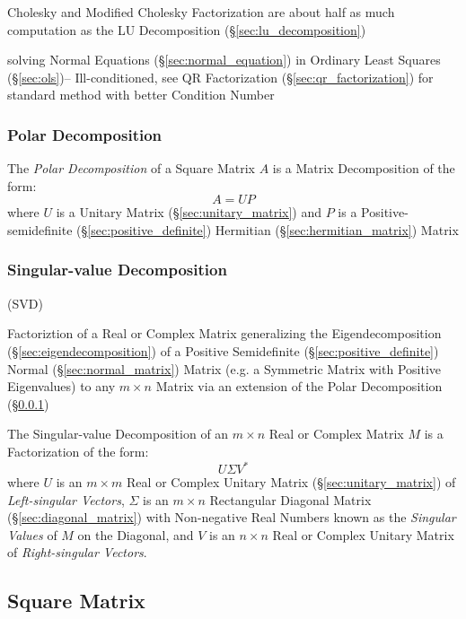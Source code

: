 Cholesky and Modified Cholesky Factorization are about half as much computation
as the LU Decomposition (\S\ref{sec:lu_decomposition})

solving Normal Equations (\S\ref{sec:normal_equation}) in Ordinary Least Squares
(\S\ref{sec:ols})-- Ill-conditioned, see QR Factorization
(\S\ref{sec:qr_factorization}) for standard method with better Condition Number



\subsubsection{Polar Decomposition}\label{sec:polar_decomposition}

The \emph{Polar Decomposition} of a Square Matrix $A$ is a Matrix Decomposition
of the form:
\[
  A = U P
\]
where $U$ is a Unitary Matrix (\S\ref{sec:unitary_matrix}) and $P$ is a
Positive-semidefinite (\S\ref{sec:positive_definite}) Hermitian
(\S\ref{sec:hermitian_matrix}) Matrix



\subsubsection{Singular-value Decomposition}\label{sec:svd}

(SVD)

Factoriztion of a Real or Complex Matrix generalizing the Eigendecomposition
(\S\ref{sec:eigendecomposition}) of a Positive Semidefinite
(\S\ref{sec:positive_definite}) Normal (\S\ref{sec:normal_matrix}) Matrix (e.g.
a Symmetric Matrix with Positive Eigenvalues) to any $m \times n$ Matrix via an
extension of the Polar Decomposition (\S\ref{sec:polar_decomposition})

The Singular-value Decomposition of an $m \times n$ Real or Complex Matrix $M$
is a Factorization of the form:
\[
  U \Sigma V^*
\]
where $U$ is an $m \times m$ Real or Complex Unitary Matrix
(\S\ref{sec:unitary_matrix}) of \emph{Left-singular Vectors}, $\Sigma$ is an $m
\times n$ Rectangular Diagonal Matrix (\S\ref{sec:diagonal_matrix}) with
Non-negative Real Numbers known as the \emph{Singular Values} of $M$ on the
Diagonal, and $V$ is an $n \times n$ Real or Complex Unitary Matrix of
\emph{Right-singular Vectors}.



\subsection{Square Matrix}\label{sec:square_matrix}


